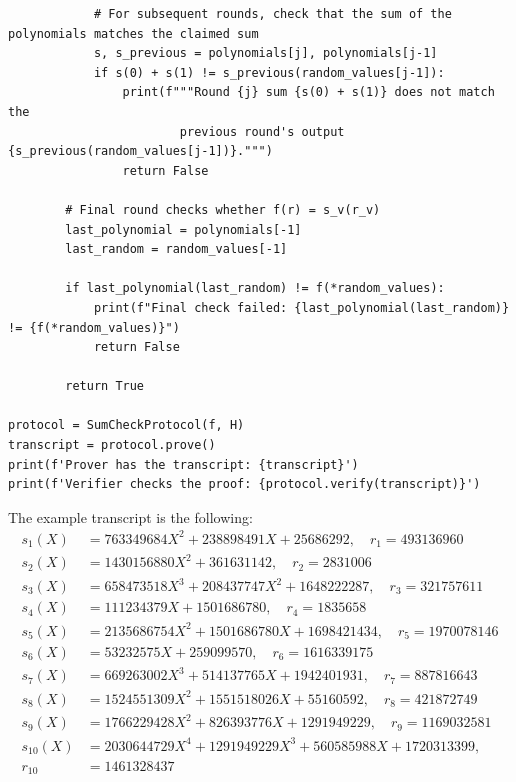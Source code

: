 \begin{verbatim}
            # For subsequent rounds, check that the sum of the polynomials matches the claimed sum
            s, s_previous = polynomials[j], polynomials[j-1]
            if s(0) + s(1) != s_previous(random_values[j-1]):
                print(f"""Round {j} sum {s(0) + s(1)} does not match the 
                        previous round's output {s_previous(random_values[j-1])}.""")
                return False

        # Final round checks whether f(r) = s_v(r_v)
        last_polynomial = polynomials[-1]
        last_random = random_values[-1]

        if last_polynomial(last_random) != f(*random_values):
            print(f"Final check failed: {last_polynomial(last_random)} != {f(*random_values)}")
            return False
        
        return True

protocol = SumCheckProtocol(f, H)
transcript = protocol.prove()
print(f'Prover has the transcript: {transcript}')
print(f'Verifier checks the proof: {protocol.verify(transcript)}')
\end{verbatim}


The example transcript is the following:
\begin{align*}
    s_1(X) &= 763349684X^2 + 238898491X + 25686292, \quad r_1 = 493136960 \\
    s_2(X) &= 1430156880X^2 + 361631142, \quad r_2 = 2831006 \\
    s_3(X) &= 658473518X^3 + 208437747X^2 + 1648222287, \quad r_3 = 321757611 \\
    s_4(X) &= 111234379X + 1501686780, \quad r_4 = 1835658 \\
    s_5(X) &= 2135686754X^2 + 1501686780X + 1698421434, \quad r_5 = 1970078146 \\
    s_6(X) &= 53232575X + 259099570, \quad r_6 = 1616339175 \\
    s_7(X) &= 669263002X^3 + 514137765X + 1942401931, \quad r_7 = 887816643 \\
    s_8(X) &= 1524551309X^2 + 1551518026X + 55160592, \quad r_8 = 421872749 \\
    s_9(X) &= 1766229428X^2 + 826393776X + 1291949229, \quad r_9 = 1169032581 \\
    s_{10}(X) &= 2030644729X^4 + 1291949229X^3 + 560585988X + 1720313399, \\
    r_{10} &= 1461328437
\end{align*}

